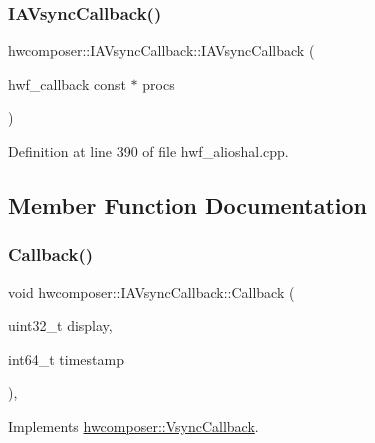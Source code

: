 \subsubsection{\texorpdfstring{I\+A\+Vsync\+Callback()}{IAVsyncCallback()}}
{\footnotesize\ttfamily hwcomposer\+::\+I\+A\+Vsync\+Callback\+::\+I\+A\+Vsync\+Callback (\begin{DoxyParamCaption}\item[{hwf\+\_\+callback const $\ast$}]{procs }\end{DoxyParamCaption})\hspace{0.3cm}{\ttfamily [inline]}}



Definition at line 390 of file hwf\+\_\+alioshal.\+cpp.


\begin{DoxyCode}{0}
\end{DoxyCode}


\subsection{Member Function Documentation}
\mbox{\label{classhwcomposer_1_1IAVsyncCallback_a9ccc6eb6a50d308473716a225e320c8d}} 
\subsubsection{\texorpdfstring{Callback()}{Callback()}}
{\footnotesize\ttfamily void hwcomposer\+::\+I\+A\+Vsync\+Callback\+::\+Callback (\begin{DoxyParamCaption}\item[{uint32\+\_\+t}]{display,  }\item[{int64\+\_\+t}]{timestamp }\end{DoxyParamCaption})\hspace{0.3cm}{\ttfamily [inline]}, {\ttfamily [virtual]}}



Implements \mbox{\hyperlink{classhwcomposer_1_1VsyncCallback_a632ac6a2e13e1b387df9508507a2ed4d}{hwcomposer\+::\+Vsync\+Callback}}.



